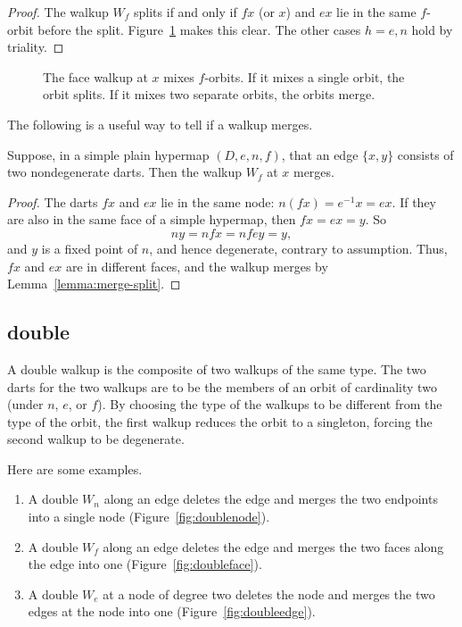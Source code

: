 \begin{proof} The walkup $W_f$ splits if and only if $f x$ 
(or $x$)
and $e x$ lie in the same $f$-orbit before the split. 
Figure~\ref{fig:split} makes this clear.
The other cases $h=e,n$ hold by triality.
\end{proof}


\begin{figure}[htb]
\centering
{}
\caption{The face walkup at $x$ mixes $f$-orbits.  If it mixes a
  single orbit, the orbit splits. If it mixes two separate orbits, the
  orbits merge. }
\label{fig:split}
\end{figure}

The following is a useful way to tell if a walkup merges.


\begin{lemma}\label{lemma:ng-merge}  
Suppose, in a simple plain hypermap $(D,e,n,f)$, that an edge $\{x,y\}$ consists
of two nondegenerate darts.  Then the walkup $W_f$ 
at $x$ merges.
\end{lemma}
%

\begin{proof}
The darts $f x$ and $e x$ lie in the same node: $n (f x) = e^{-1} x
= e x$. If they are also in the same face of a simple hypermap, then
$f x = e x = y$. So
\[ n y = n f x = n f e y = y,\]  and $y$
is a fixed point of $n$, and hence degenerate, contrary to assumption.
Thus, $f x$ and $e x$ are in different faces, and the walkup merges by
Lemma~\ref{lemma:merge-split}.
\end{proof}


\subsection{double}
%

A double walkup is the composite of two walkups of the same type.  The
two darts for the two walkups are to be the members of an orbit of
cardinality two (under $n$, $e$, or $f$).
By choosing the type of the walkups to be different from the type of
the orbit, the first walkup reduces the orbit to a singleton, forcing
the second walkup to be degenerate.

Here are some examples.
\begin{enumerate}\wasitemize 
\item A double $W_n$ along an edge deletes the edge and merges the two
  endpoints into a single node (Figure~\ref{fig:doublenode}).
\item A double $W_f$ along an edge deletes the edge and merges the two
  faces along the edge into one (Figure~\ref{fig:doubleface}).
\item A double $W_e$ at a node of degree two deletes the node and
  merges the two edges at the node into one
  (Figure~\ref{fig:doubleedge}).
\end{enumerate}\wasitemize 


